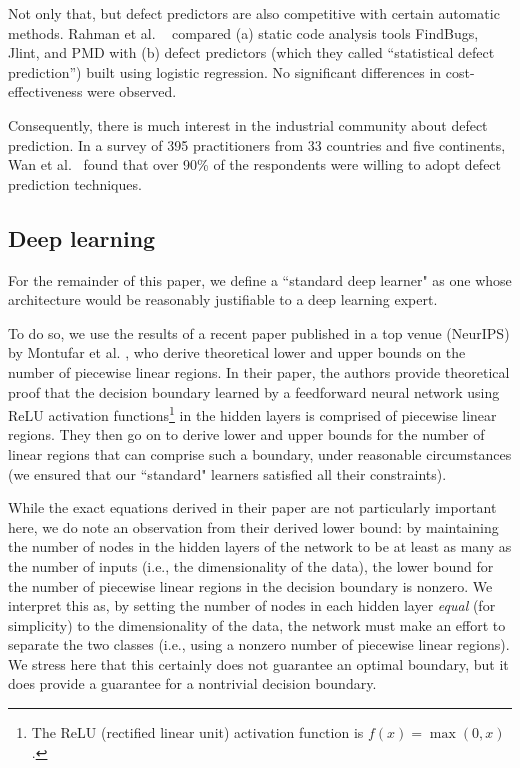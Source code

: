 \documentclass[10pt,compsoc,twocolumn]{IEEEtran}
\newcommand{\BLUE}{\color{blue}}
\begin{document}
Not only that, but defect predictors  are also competitive with certain automatic methods. 
Rahman et al. ~\cite{rahman2014comparing} compared (a) static code analysis tools FindBugs, Jlint, and PMD with (b) defect predictors (which they called ``statistical defect prediction'') built using logistic regression.
No significant differences in cost-effectiveness were observed.

Consequently,
there is much  interest in the  industrial community about defect prediction.
In  a  survey  of  395  practitioners  from  33  countries  and five  continents,  Wan  et  al.~\cite{wan2018perceptions} found  that  over  90\%  of the  respondents  were  willing  to  adopt  defect  prediction techniques.

\BLUE 
\subsection{Deep learning}
\label{sec:deeplearning}

 For the remainder of this paper, we define a ``standard deep learner" as one whose architecture would be reasonably justifiable to a deep learning expert. 
 
 To do so, we use the results of a recent paper published in a top venue (NeurIPS) by Montufar et al. \cite{montufar2014number}, who derive theoretical lower and upper bounds on the number of piecewise linear regions. In their paper, the authors provide theoretical proof that the decision boundary learned by a feedforward neural network \cite{lecun2015deep} using ReLU activation functions\footnote{The ReLU (rectified linear unit) activation function is $f(x) = \max(0, x)$.} in the hidden layers is comprised of piecewise linear regions. They then go on to derive lower and upper bounds for the number of linear regions that can comprise such a boundary, under reasonable circumstances (we ensured that our ``standard" learners satisfied all their constraints). 
 
 While the exact equations derived in their paper are not particularly important here, we do note an observation from their derived lower bound: by maintaining the number of nodes in the hidden layers of the network to be at least as many as the number of inputs (i.e., the dimensionality of the data), the lower bound for the number of piecewise linear regions in the decision boundary is nonzero. We interpret this as, by setting the number of nodes in each hidden layer \textit{equal} (for simplicity) to the dimensionality of the data, the network must make an effort to separate the two classes (i.e., using a nonzero number of piecewise linear regions). We stress here that this certainly does not guarantee an optimal boundary, but it does provide a guarantee for a nontrivial decision boundary.
 
\end{document}
